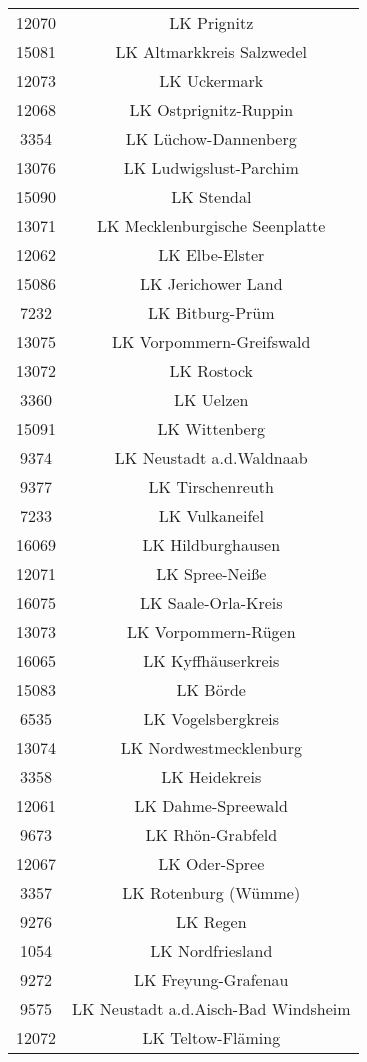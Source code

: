\begin{tabular}{c c}
    12070&LK Prignitz\\ 
    15081&LK Altmarkkreis Salzwedel\\ 
    12073&LK Uckermark\\ 
    12068&LK Ostprignitz-Ruppin\\ 
    3354&LK Lüchow-Dannenberg\\ 
    13076&LK Ludwigslust-Parchim\\ 
    15090&LK Stendal\\ 
    13071&LK Mecklenburgische Seenplatte\\ 
    12062&LK Elbe-Elster\\ 
    15086&LK Jerichower Land\\ 
    7232&LK Bitburg-Prüm\\ 
    13075&LK Vorpommern-Greifswald\\ 
    13072&LK Rostock\\ 
    3360&LK Uelzen\\ 
    15091&LK Wittenberg\\ 
    9374&LK Neustadt a.d.Waldnaab\\ 
    9377&LK Tirschenreuth\\ 
    7233&LK Vulkaneifel\\ 
    16069&LK Hildburghausen\\ 
    12071&LK Spree-Neiße\\ 
    16075&LK Saale-Orla-Kreis\\ 
    13073&LK Vorpommern-Rügen\\ 
    16065&LK Kyffhäuserkreis\\ 
    15083&LK Börde\\ 
    6535&LK Vogelsbergkreis\\ 
    13074&LK Nordwestmecklenburg\\ 
    3358&LK Heidekreis\\ 
    12061&LK Dahme-Spreewald\\ 
    9673&LK Rhön-Grabfeld\\ 
    12067&LK Oder-Spree\\ 
    3357&LK Rotenburg (Wümme)\\ 
    9276&LK Regen\\ 
    1054&LK Nordfriesland\\ 
    9272&LK Freyung-Grafenau\\ 
    9575&LK Neustadt a.d.Aisch-Bad Windsheim\\ 
    12072&LK Teltow-Fläming\\ 

\end{tabular}
